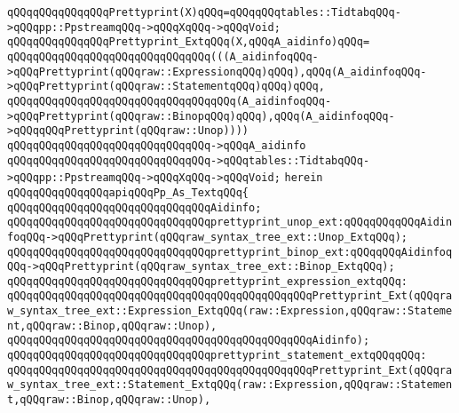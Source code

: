 \newline
\verb|qQQqqQQqqQQqqQQqPrettyprint(X)qQQq=qQQqqQQqtables::TidtabqQQq->qQQqpp::PpstreamqQQq->qQQqXqQQq->qQQqVoid;|\newline
\newline
\verb|qQQqqQQqqQQqqQQqPrettyprint_ExtqQQq(X,qQQqA_aidinfo)qQQq=|\newline
\verb|qQQqqQQqqQQqqQQqqQQqqQQqqQQqqQQq(((A_aidinfoqQQq->qQQqPrettyprint(qQQqraw::ExpressionqQQq)qQQq),qQQq(A_aidinfoqQQq->qQQqPrettyprint(qQQqraw::StatementqQQq)qQQq)qQQq,|\newline
\verb|qQQqqQQqqQQqqQQqqQQqqQQqqQQqqQQqqQQq(A_aidinfoqQQq->qQQqPrettyprint(qQQqraw::BinopqQQq)qQQq),qQQq(A_aidinfoqQQq->qQQqqQQqPrettyprint(qQQqraw::Unop))))|\newline
\verb|qQQqqQQqqQQqqQQqqQQqqQQqqQQqqQQq->qQQqA_aidinfo|\newline
\verb|qQQqqQQqqQQqqQQqqQQqqQQqqQQqqQQq->qQQqtables::TidtabqQQq->qQQqpp::PpstreamqQQq->qQQqXqQQq->qQQqVoid;|\newline
\verb|herein|\newline
\newline
\verb|qQQqqQQqqQQqqQQqapiqQQqPp_As_TextqQQq{|\newline
\newline
\verb|qQQqqQQqqQQqqQQqqQQqqQQqqQQqqQQqAidinfo;|\newline
\newline
\verb|qQQqqQQqqQQqqQQqqQQqqQQqqQQqqQQqprettyprint_unop_ext:qQQqqQQqqQQqAidinfoqQQq->qQQqPrettyprint(qQQqraw_syntax_tree_ext::Unop_ExtqQQq);|\newline
\verb|qQQqqQQqqQQqqQQqqQQqqQQqqQQqqQQqprettyprint_binop_ext:qQQqqQQqAidinfoqQQq->qQQqPrettyprint(qQQqraw_syntax_tree_ext::Binop_ExtqQQq);|\newline
\newline
\verb|qQQqqQQqqQQqqQQqqQQqqQQqqQQqqQQqprettyprint_expression_extqQQq:|\newline
\verb|qQQqqQQqqQQqqQQqqQQqqQQqqQQqqQQqqQQqqQQqqQQqqQQqPrettyprint_Ext(qQQqraw_syntax_tree_ext::Expression_ExtqQQq(raw::Expression,qQQqraw::Statement,qQQqraw::Binop,qQQqraw::Unop),|\newline
\verb|qQQqqQQqqQQqqQQqqQQqqQQqqQQqqQQqqQQqqQQqqQQqqQQqAidinfo);|\newline
\newline
\verb|qQQqqQQqqQQqqQQqqQQqqQQqqQQqqQQqprettyprint_statement_extqQQqqQQq:|\newline
\verb|qQQqqQQqqQQqqQQqqQQqqQQqqQQqqQQqqQQqqQQqqQQqqQQqPrettyprint_Ext(qQQqraw_syntax_tree_ext::Statement_ExtqQQq(raw::Expression,qQQqraw::Statement,qQQqraw::Binop,qQQqraw::Unop),|\newline

